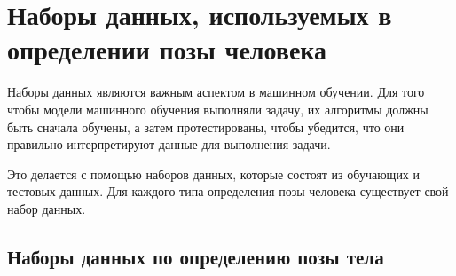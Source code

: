 \section{Наборы данных, используемых в определении позы человека}

Наборы данных являются важным аспектом в машинном обучении. Для того чтобы модели машинного обучения выполняли задачу, их алгоритмы должны быть сначала обучены, а затем протестированы, чтобы убедится, что они правильно интерпретируют данные для выполнения задачи.

Это делается с помощью наборов данных, которые состоят из обучающих и тестовых данных. 
Для каждого типа определения позы человека существует свой набор данных.

\subsection{Наборы данных по определению позы тела}

